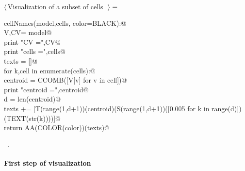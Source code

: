\documentclass[11pt,oneside]{article}	%
\begin{document}
\begin{flushleft} \small \label{scrap39}
$\langle\,$Visualization of a subset of cells\nobreak\ {\footnotesize {}}$\,\rangle\equiv$
\vspace{-1ex}
\begin{list}{}{} \item
\mbox{}\verb@def cellNames(model,cells, color=BLACK):@\\
\mbox{}\verb@   V,CV= model@\\
\mbox{}\verb@   print "\n CV =",CV@\\
\mbox{}\verb@   print "\n cells =",cells@\\
\mbox{}\verb@   texts = []@\\
\mbox{}\verb@   for k,cell in enumerate(cells):@\\
\mbox{}\verb@      centroid = CCOMB([V[v] for v in cell])@\\
\mbox{}\verb@      print "centroid =",centroid@\\
\mbox{}\verb@      d = len(centroid)@\\
\mbox{}\verb@      texts += [T(range(1,d+1))(centroid)(S(range(1,d+1))([0.005 for k in range(d)])(TEXT(str(k))))]@\\
\mbox{}\verb@   return AA(COLOR(color))(texts)@\\
\mbox{}\verb@@{\NWsep}
\end{list}
\vspace{-1ex}
\footnotesize\addtolength{\baselineskip}{-1ex}
\begin{list}{}{\setlength{\itemsep}{-\parsep}\setlength{\itemindent}{-\leftmargin}}
\item \NWtxtMacroRefIn\ .
\end{list}
\end{flushleft}


\paragraph{First step of visualization}
\end{document}
